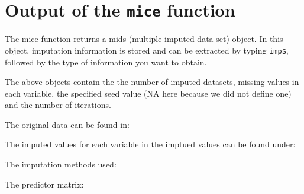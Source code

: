 \documentclass[
]{book}
\newenvironment{Shaded}{\begin{snugshade}}{\end{snugshade}}
\newcommand{\NormalTok}[1]{#1}
\newcommand{\SpecialCharTok}[1]{\textcolor[rgb]{0.00,0.00,0.00}{#1}}
\begin{document}
\hypertarget{output-of-the-mice-function}{%
\section{\texorpdfstring{Output of the \texttt{mice} function}{Output of the mice function}}\label{output-of-the-mice-function}}

The mice function returns a mids (multiple imputed data set) object. In this object, imputation information is stored and can be extracted by typing \texttt{imp\$}, followed by the type of information you want to obtain.

\begin{Shaded}
\end{Shaded}

The above objects contain the the number of imputed datasets, missing values in each variable, the specified seed value (NA here because we did not define one) and the number of iterations.

The original data can be found in:

\begin{Shaded}
\end{Shaded}

The imputed values for each variable in the imptued values can be found under:

\begin{Shaded}
\end{Shaded}

The imputation methods used:

\begin{Shaded}
\end{Shaded}

The predictor matrix:
\end{document}
